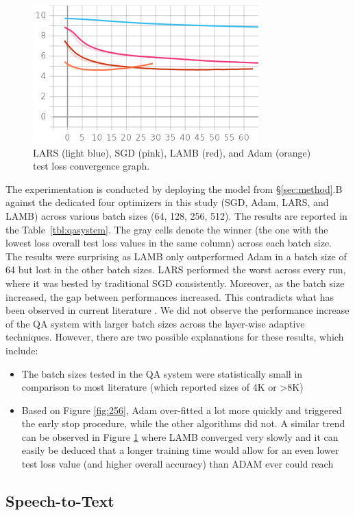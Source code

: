 \begin{figure}[!t]
    \centering
    \includegraphics[width=0.7\linewidth]{img/drqa_128_blars_oadam_psgd_rlamb.png}
    \caption{LARS (light blue), SGD (pink), LAMB (red), and Adam (orange) test loss convergence graph.}
    \label{fig:128}
\end{figure}

The experimentation is conducted by deploying the model from \S\ref{sec:method}.B against the dedicated four optimizers in this study (SGD, Adam, LARS, and LAMB) across various batch sizes (64, 128, 256, 512). The results are reported in the Table~\ref{tbl:qasystem}. The gray cells denote the winner (the one with the lowest loss overall test loss values in the same column) across each batch size. The results were surprising as LAMB only outperformed Adam in a batch size of 64 but lost in the other batch sizes. LARS performed the worst across every run, where it was bested by traditional SGD consistently. Moreover, as the batch size increased, the gap between performances increased. This contradicts what has been observed in current literature \cite{}. We did not observe the performance increase of the QA system with larger batch sizes across the layer-wise adaptive techniques. However, there are two possible explanations for these results, which include: 
\begin{itemize}
    \item The batch sizes tested in the QA system were statistically small in comparison to most literature (which reported sizes of 4K or >8K)
    \item Based on Figure \ref{fig:256}, Adam over-fitted a lot more quickly and triggered the early stop procedure, while the other algorithms did not. A similar trend can be observed in Figure \ref{fig:128} where LAMB converged very slowly and it can easily be deduced that a longer training time would allow for an even lower test loss value (and higher overall accuracy) than ADAM ever could reach
\end{itemize}

\subsection{Speech-to-Text}


